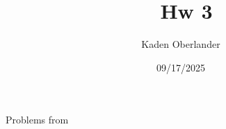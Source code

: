


\title{\textbf{\myclass{\ballocks}\ Hw 3}}
\author{Kaden Oberlander}
\date{09/17/2025}
\newcommand{\ballocks}{Uwogic}


	\hypersetup{bookmarksnumbered=true,}
	\maketitle
	Problems from \cite{\ballocks}
	
	
\setcounter{equation}{0}	
\begin{problem*}{}{}

\end{problem*}

\setcounter{equation}{0}
\begin{problem*}{}{}

\end{problem*}

\setcounter{equation}{0}
\begin{problem*}{}{}

\end{problem*}

\setcounter{equation}{0}
\begin{problem*}{}{}

\end{problem*}

\setcounter{equation}{0}
\begin{problem*}{}{}
	
\end{problem*}

\setcounter{equation}{0}
\begin{problem*}{}{}
	
\end{problem*}

\setcounter{equation}{0}
\begin{problem*}{}{}
	
\end{problem*}

\setcounter{equation}{0}
\begin{problem*}{}{}
	
\end{problem*}

\setcounter{equation}{0}
\begin{problem*}{}{}
	
\end{problem*}

\setcounter{equation}{0}
\begin{problem*}{}{}
	
\end{problem*}

\setcounter{equation}{0}
\begin{problem*}{}{}
	
\end{problem*}

